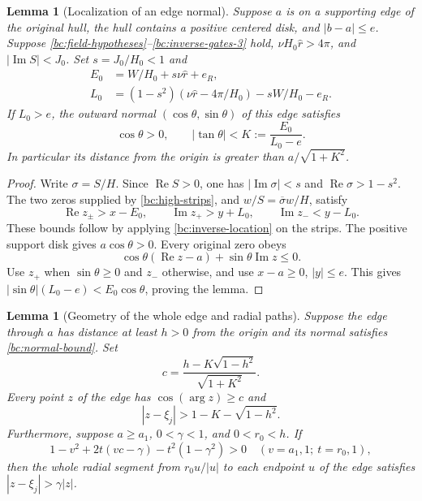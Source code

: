 \documentclass[11pt,reqno]{amsart}
\numberwithin{equation}{section}
\newtheorem{lemma}[theorem]{Lemma}
\theoremstyle{definition}
\theoremstyle{remark}
\renewcommand{\Re}{\operatorname{Re}}
\renewcommand{\Im}{\operatorname{Im}}
\begin{document}
\begin{lemma}[Localization of an edge normal]\label{bc:edge-normal}
Suppose $a$ is on a supporting edge of the original hull, the hull
contains a positive centered disk, and $|b-a|\leq e$.  Suppose
\eqref{bc:field-hypotheses}--\eqref{bc:inverse-gates-3} hold,
$\nu H_0\widehat r>4\pi$, and $|\Im S|<J_0$.
Set $s=J_0/H_0<1$ and
\begin{align}
 E_0&=W/H_0+s\nu\widehat r+e_R,\nonumber\\
 L_0&=(1-s^2)(\nu\widehat r-4\pi/H_0)-sW/H_0-e_R.
                                                        \label{bc:normal-errors}
\end{align}
If $L_0>e$, the outward normal $(\cos\theta,\sin\theta)$ of this
edge satisfies
\begin{equation}\label{bc:normal-bound}
 \cos\theta>0,\qquad |\tan\theta|<K:=\frac{E_0}{L_0-e}.
\end{equation}
In particular its distance from the origin is greater than
$a/\sqrt{1+K^2}$.
\end{lemma}

\begin{proof}
Write $\sigma=S/H$.  Since $\Re S>0$, one has
$|\Im\sigma|<s$ and $\Re\sigma>1-s^2$.  The two zeros supplied
by \eqref{bc:high-strips}, and $w/S=\overline\sigma w/H$, satisfy
\[
 \Re z_\pm>x-E_0,\qquad
 \Im z_+>y+L_0,\qquad \Im z_-<y-L_0.
\]
These bounds follow by applying \eqref{bc:inverse-location} on the
strips.
The positive support disk gives $a\cos\theta>0$.  Every original
zero obeys
\[
 \cos\theta(\Re z-a)+\sin\theta\Im z\leq0.
\]
Use $z_+$ when $\sin\theta\geq0$ and $z_-$ otherwise, and use
$x-a\geq0$, $|y|\leq e$.  This gives
$|\sin\theta|(L_0-e)<E_0\cos\theta$, proving the lemma.
\end{proof}

\begin{lemma}[Geometry of the whole edge and radial paths]
\label{bc:edge-geometry}
Suppose the edge through $a$ has distance at least $h>0$ from the
origin and its normal satisfies \eqref{bc:normal-bound}.  Set
\[
 c=\frac{h-K\sqrt{1-h^2}}{\sqrt{1+K^2}}.
\]
Every point $z$ of the edge has $\cos(\arg z)\geq c$ and
\begin{equation}\label{bc:whole-edge-gap}
 |z-\xi_j|>1-K-\sqrt{1-h^2}.
\end{equation}
Furthermore, suppose $a\geq a_1$, $0<\gamma<1$, and $0<r_0<h$.
If
\begin{equation}\label{bc:four-corners}
 1-v^2+2t(vc-\gamma)-t^2(1-\gamma^2)>0
 \quad(v=a_1,1;\ t=r_0,1),
\end{equation}
then the whole radial segment from $r_0u/|u|$ to each endpoint $u$
of the edge satisfies $|z-\xi_j|>\gamma|z|$.
\end{lemma}
\end{document}
